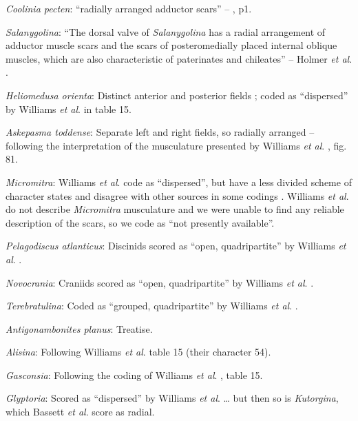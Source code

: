 \documentclass[]{book}
\theoremstyle{definition}
\theoremstyle{definition}
\theoremstyle{definition}
\theoremstyle{remark}
\begin{document}
\emph{Coolinia pecten}: ``radially arranged adductor scars'' --
\citet{Bassett2017Earliestontogeny}, p1.

\emph{Salanygolina}: ``The dorsal valve of \emph{Salanygolina} has a
radial arrangement of adductor muscle scars and the scars of
posteromedially placed internal oblique muscles, which are also
characteristic of paterinates and chileates'' -- Holmer \emph{et al}.
\citeyearpar{Holmer2009Theenigmatic}.

\emph{Heliomedusa orienta}: Distinct anterior and posterior fields
\citep{Chen2007Reinterpretationof}; coded as ``dispersed'' by Williams
\emph{et al}. \citeyearpar{Williams2000BrachiopodaLinguliformea} in
table 15.

\emph{Askepasma toddense}: Separate left and right fields, so radially
arranged -- following the interpretation of the musculature presented by
Williams \emph{et al}.
\citeyearpar{Williams2000BrachiopodaLinguliformea}, fig. 81.

\emph{Micromitra}: Williams \emph{et al}.
\citeyearpar{Williams1998Thediversity} code as ``dispersed'', but have a
less divided scheme of character states and disagree with other sources
in some codings \citep[e.g.][in
Kutorginates]{Bassett2001Functionalmorphology}. Williams \emph{et al}.
\citeyearpar{Williams2000BrachiopodaLinguliformea} do not describe
\emph{Micromitra} musculature and we were unable to find any reliable
description of the scars, so we code as ``not presently available''.

\emph{Pelagodiscus atlanticus}: Discinids scored as ``open,
quadripartite'' by Williams \emph{et al}.
\citeyearpar{Williams1996Asupra}.

\emph{Novocrania}: Craniids scored as ``open, quadripartite'' by
Williams \emph{et al}. \citeyearpar{Williams1996Asupra}.

\emph{Terebratulina}: Coded as ``grouped, quadripartite'' by Williams
\emph{et al}. \citeyearpar{Williams1996Asupra}.

\emph{Antigonambonites planus}: Treatise.

\emph{Alisina}: Following Williams \emph{et al}.
\citeyearpar{Williams2000BrachiopodaLinguliformea} table 15 (their
character 54).

\emph{Gasconsia}: Following the coding of Williams \emph{et al}.
\citeyearpar{Williams2000BrachiopodaLinguliformea}, table 15.

\emph{Glyptoria}: Scored as ``dispersed'' by Williams \emph{et al}.
\citeyearpar{Williams1998Thediversity} \ldots{} but then so is
\emph{Kutorgina}, which Bassett \emph{et al}.
\citeyearpar{Bassett2001Functionalmorphology} score as radial.
\end{document}
